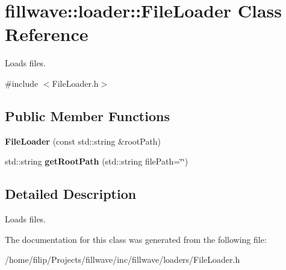 \hypertarget{classfillwave_1_1loader_1_1FileLoader}{}\section{fillwave\+:\+:loader\+:\+:File\+Loader Class Reference}
\label{classfillwave_1_1loader_1_1FileLoader}


Loads files.  




{\ttfamily \#include $<$File\+Loader.\+h$>$}

\subsection*{Public Member Functions}
\begin{DoxyCompactItemize}
\item 
\hypertarget{classfillwave_1_1loader_1_1FileLoader_a53006e2e7d5cc39317928a0065992e2d}{}{\bfseries File\+Loader} (const std\+::string \&root\+Path)\label{classfillwave_1_1loader_1_1FileLoader_a53006e2e7d5cc39317928a0065992e2d}

\item 
\hypertarget{classfillwave_1_1loader_1_1FileLoader_a867d0d51e34560ccc1c48e2a546260f9}{}std\+::string {\bfseries get\+Root\+Path} (std\+::string file\+Path=\char`\"{}\char`\"{})\label{classfillwave_1_1loader_1_1FileLoader_a867d0d51e34560ccc1c48e2a546260f9}

\end{DoxyCompactItemize}


\subsection{Detailed Description}
Loads files. 

The documentation for this class was generated from the following file\+:\begin{DoxyCompactItemize}
\item 
/home/filip/\+Projects/fillwave/inc/fillwave/loaders/File\+Loader.\+h\end{DoxyCompactItemize}
